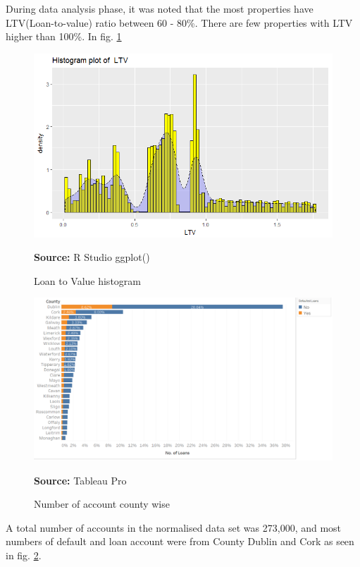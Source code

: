 During data analysis phase, it was noted that the most properties have LTV(Loan-to-value) ratio between 60 - 80\%. There are few properties with LTV higher than 100\%.
In fig. \ref{fig:ltv}
\begin{center}
\begin{figure}[!htb]
\includegraphics[scale=0.5]{ltv.png}
\centering
\caption{Loan to Value histogram}{\textbf{Source:} R Studio ggplot()}
\label{fig:ltv}
\end{figure}
\end{center}

\begin{center}
\begin{figure}[!htb]
\includegraphics[scale=.4]{countynumber.png}
\centering
\caption{Number of account county wise}{\textbf{Source:} Tableau Pro}
\label{fig:tableaucounty}
\end{figure}
\end{center}

A total number of accounts in the normalised data set was 273,000, and most numbers of default and loan account were from County Dublin and Cork as seen in fig. \ref{fig:tableaucounty}.

